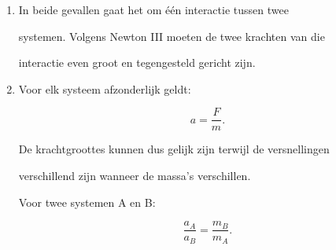 \documentclass{ximera}
\begin{document}
\begin{oefening}{\oefG}
\begin{oplossing}
\begin{enumerate}
  krachtvectoren wijzen daarom van elkaar weg.

  \item In beide gevallen gaat het om één interactie tussen twee

  systemen. Volgens Newton III moeten de twee krachten van die

  interactie even groot en tegengesteld gericht zijn.

  \item Voor elk systeem afzonderlijk geldt:

  \[a=\frac{F}{m}.\]

  De krachtgroottes kunnen dus gelijk zijn terwijl de versnellingen

  verschillend zijn wanneer de massa's verschillen.

  Voor twee systemen A en B:

  \[\frac{a_A}{a_B} = \frac{m_B}{m_A}.\]

\end{enumerate}

\end{oplossing}

\end{oefening}
\end{document}

